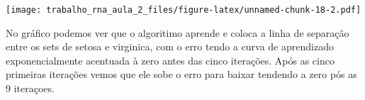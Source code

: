 \documentclass[
]{article}
\begin{document}
\texttt{[image: trabalho\_rna\_aula\_2\_files/figure-latex/unnamed-chunk-18-2.pdf]}

No gráfico podemos ver que o algoritimo aprende e coloca a linha de
separação entre os sets de setosa e virginica, com o erro tendo a curva
de aprendizado exponencialmente acentuada à zero antes das cinco
iterações. Após as cinco primeiras iterações vemos que ele sobe o erro
para baixar tendendo a zero pós as 9 iteraçoes.
\end{document}
